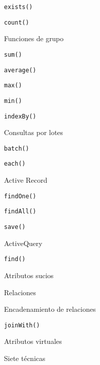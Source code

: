 \begin{longenum}
\begin{longenum}
\begin{longenum}
\begin{longenum}
                \item \texttt{exists()}
                \item \texttt{count()}
                \item Funciones de grupo
                \begin{longenum}
                    \item \texttt{sum()}
                    \item \texttt{average()}
                    \item \texttt{max()}
                    \item \texttt{min()}
                \end{longenum}
                \item \texttt{indexBy()}
            \end{longenum}
            \item Consultas por lotes
            \begin{longenum}
                \item \texttt{batch()}
                \item \texttt{each()}
            \end{longenum}
        \end{longenum}
        \item Active Record
        \begin{longenum}
            \item \texttt{findOne()}
            \item \texttt{findAll()}
            \item \texttt{save()}
            \item ActiveQuery
            \begin{longenum}
                \item \texttt{find()}
            \end{longenum}
            \item Atributos sucios
            \item Relaciones
            \begin{longenum}
                \item Encadenamiento de relaciones
            \end{longenum}
            \item \texttt{joinWith()}
            \item Atributos virtuales
            \begin{longenum}
                \item Siete técnicas

\end{longenum}
\end{longenum}
\end{longenum}
\end{longenum}
